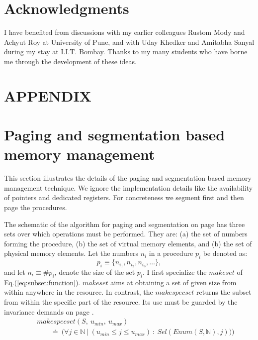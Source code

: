 \documentclass[draft]{article}
\def\names{\doteq}
\begin{document}
\section*{Acknowledgments}
\label{ack}
I have  benefited from discussions  with my earlier  colleagues Rustom
Mody and Achyut  Roy at University of Pune, and  with Uday Khedker and
Amitabha Sanyal during  my stay at I.I.T.  Bombay.   Thanks to my many
students who have borne me through the development of these ideas.




\appendix

\section*{APPENDIX}
\section{Paging and segmentation based memory management}
\label{sec:mm:with:page:segment}

This section  illustrates the details  of the paging  and segmentation
based  memory  management  technique.   We ignore  the  implementation
details  like the  availability of  pointers and  dedicated registers.
For concreteness we segment first and then page the procedures.

The schematic  of the  algorithm for paging  and segmentation  on page
\pageref{paging:algo:schematic} has  three sets over  which operations
must  be performed.   They are:  (a) the  set of  numbers  forming the
procedure, (b) the set of virtual  memory elements, and (b) the set of
physical memory elements.  Let the numbers $n_i$ in a procedure $p_i$
be denoted as:
\begin{equation}
  \label{eq:denoting:nums:in:procs}
  p_i \equiv \{n_{i_1}, n_{i_2}, n_{i_3}, \ldots\},
\end{equation}
and let $n_i \equiv \#p_i$, denote the size of the set $p_i$.  I first
specialize the  $makeset$ of Eq.(\ref{eq:subset:function}).  $makeset$
aims at  obtaining a  set of  given size from  within anywhere  in the
resource.   In contrast,  the  $makespecset$ returns  the subset  from
within the specific part of the  resource.  Its use must be guarded by
the invariance demands on page \pageref{eq:total:size:invariance}.
\begin{eqnarray}
  \label{eq:specific:subset:function} 
  &~&
  makespecset (S,\ u_{min},\ u_{max}) 
  \nonumber \\
  &~&
  \quad\quad
  \names\ \biggl(\forall j \in \mathbb{N}\ \vert\  (u_{min} \le j \le
  u_{max})\ :\ 
  Sel(Enum(S,\mathbb{N}), j)
  \biggr)\biggr)
\end{eqnarray}
\end{document}

